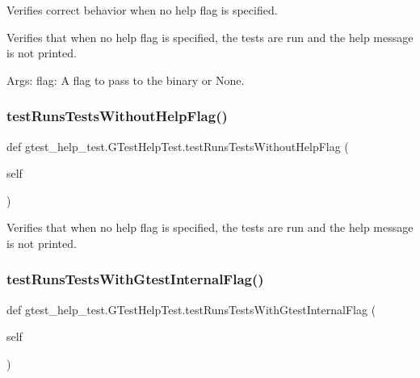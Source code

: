 \begin{DoxyVerb}Verifies correct behavior when no help flag is specified.

Verifies that when no help flag is specified, the tests are run
and the help message is not printed.

Args:
  flag:  A flag to pass to the binary or None.
\end{DoxyVerb}
 \mbox{\label{classgtest__help__test_1_1_g_test_help_test_ae7831f92e8e3763c07afb908915b3d20}} 
\subsubsection{\texorpdfstring{test\+Runs\+Tests\+Without\+Help\+Flag()}{testRunsTestsWithoutHelpFlag()}}
{\footnotesize\ttfamily def gtest\+\_\+help\+\_\+test.\+G\+Test\+Help\+Test.\+test\+Runs\+Tests\+Without\+Help\+Flag (\begin{DoxyParamCaption}\item[{}]{self }\end{DoxyParamCaption})}

\begin{DoxyVerb}Verifies that when no help flag is specified, the tests are run
and the help message is not printed.\end{DoxyVerb}
 \mbox{\label{classgtest__help__test_1_1_g_test_help_test_a0ebec2e3154d22a63e362d2196f9c638}} 
\subsubsection{\texorpdfstring{test\+Runs\+Tests\+With\+Gtest\+Internal\+Flag()}{testRunsTestsWithGtestInternalFlag()}}
{\footnotesize\ttfamily def gtest\+\_\+help\+\_\+test.\+G\+Test\+Help\+Test.\+test\+Runs\+Tests\+With\+Gtest\+Internal\+Flag (\begin{DoxyParamCaption}\item[{}]{self }\end{DoxyParamCaption})}

